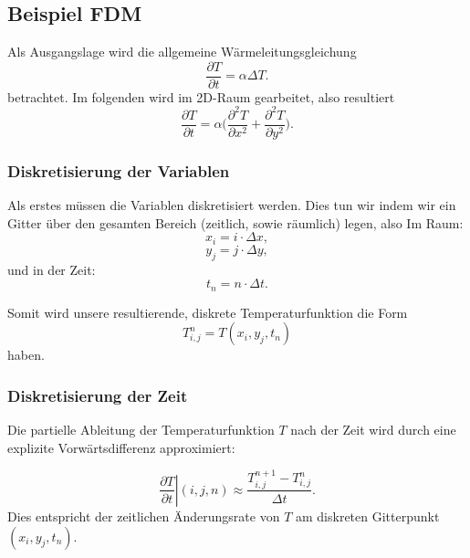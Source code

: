 \subsection{Beispiel FDM}

Als Ausgangslage wird die allgemeine Wärmeleitungsgleichung
\begin{equation}
	\frac{\partial T}{\partial t}
	=
	\alpha \Delta T.
	\label{parallelisierung:eq:Wärmeleitung_alg}
\end{equation}
betrachtet.
Im folgenden wird im 2D-Raum gearbeitet, also resultiert
\begin{equation}
	\frac{\partial T}{\partial t}
	=
	\alpha \biggl(
	\frac{\partial^2 T}{\partial x^2}
	+
	\frac{\partial^2 T}{\partial y^2}
	\biggr).
	\label{parallelisierung:eq:Wärmeleitung_2D}
\end{equation}


\subsubsection{Diskretisierung der Variablen}

Als erstes müssen die Variablen diskretisiert werden. Dies tun wir indem wir ein Gitter über den gesamten Bereich (zeitlich, sowie räumlich) legen, also
Im Raum:
\begin{equation}
	x_i
	=
	i \cdot \Delta x,
\end{equation}
\begin{equation}
	y_j
	=
	j \cdot \Delta y,
\end{equation}
und in der Zeit:
\begin{equation}
	t_n
	=
	n \cdot \Delta t.
\end{equation}

Somit wird unsere resultierende, diskrete Temperaturfunktion die Form
\begin{equation}
	T^n_{i,j}
	=
	T(x_i,y_j,t_n)
\end{equation}
haben.


\subsubsection{Diskretisierung der Zeit}

Die partielle Ableitung der Temperaturfunktion \( T \) nach der Zeit wird durch eine explizite Vorwärtsdifferenz approximiert:

\begin{equation}
	\label{parallelisierung:eq:discrete_time_derivative}
	\left. \frac{\partial T}{\partial t}\right|{(i,j,n)}
	\approx
	\frac{T_{i,j}^{n+1} - T_{i,j}^n}{\Delta t}.
\end{equation}
Dies entspricht der zeitlichen Änderungsrate von \( T \) am diskreten Gitterpunkt \( (x_i, y_j, t_n) \).

